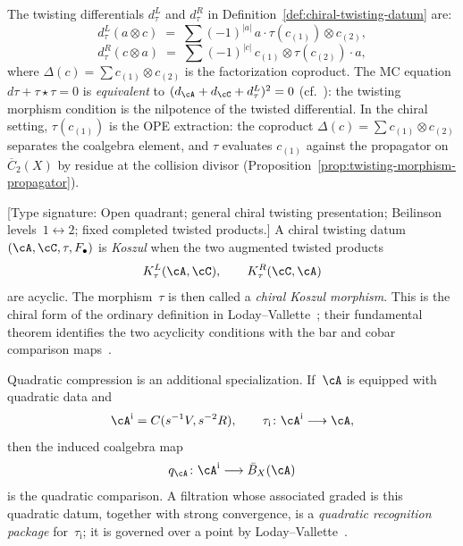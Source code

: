 \begin{remark}
\label{rem:explicit-twisted-differential}
The twisting differentials $d_\tau^L$ and $d_\tau^R$ in
Definition~\ref{def:chiral-twisting-datum} are:
\begin{equation}\label{eq:chiral-twisted-differential-L}
d_\tau^L(a \otimes c)
\;=\;
\sum (-1)^{|a|}\, a \cdot \tau(c_{(1)}) \otimes c_{(2)},
\end{equation}
\begin{equation}\label{eq:chiral-twisted-differential-R}
d_\tau^R(c \otimes a)
\;=\;
\sum (-1)^{|c|}\, c_{(1)} \otimes \tau(c_{(2)}) \cdot a,
\end{equation}
where $\Delta(c) = \sum c_{(1)} \otimes c_{(2)}$ is the factorization
coproduct. The MC equation $d\tau + \tau \star \tau = 0$ is
\emph{equivalent} to $(d_\cA + d_\cC + d_\tau^L)^2 = 0$
\textup{(}cf.\ \cite[Lemma~2.1.4]{LV12}\textup{)}: the twisting
morphism condition is the nilpotence of the twisted differential.
In the chiral setting, $\tau(c_{(1)})$ is the OPE extraction:
the coproduct $\Delta(c) = \sum c_{(1)} \otimes c_{(2)}$ separates
the coalgebra element, and $\tau$ evaluates $c_{(1)}$ against the
propagator on~$\overline{C}_2(X)$ by residue at the collision
divisor
\textup{(}Proposition~\textup{\ref{prop:twisting-morphism-propagator})}.
\end{remark}

\begin{definition}\label{def:chiral-koszul-morphism}
\textup{[Type signature: Open quadrant; general chiral twisting
presentation; Beilinson levels~$1\leftrightarrow2$; fixed completed
twisted products.]}
A chiral twisting datum $(\cA,\cC,\tau,F_\bullet)$ is
\emph{Koszul} when the two augmented twisted products
\[
 K_\tau^L(\cA,\cC),\qquad K_\tau^R(\cC,\cA)
\]
are acyclic.  The morphism~$\tau$ is then called a
\emph{chiral Koszul morphism}.  This is the chiral form of the
ordinary definition in Loday--Vallette~\cite[\S2.3]{LV12}; their
fundamental theorem identifies the two acyclicity conditions with the
bar and cobar comparison maps~\cite[Theorem~2.3.2]{LV12}.

Quadratic compression is an additional specialization.  If~$\cA$ is
equipped with quadratic data and
\[
 \cA^{\mathrm i}=C(s^{-1}V,s^{-2}R),\qquad
 \tau_{\mathrm i}\colon\cA^{\mathrm i}\longrightarrow\cA,
\]
then the induced coalgebra map
\[
 q_\cA\colon\cA^{\mathrm i}\longrightarrow\bar B_X(\cA)
\]
is the quadratic comparison.  A filtration whose associated graded is
this quadratic datum, together with strong convergence, is a
\emph{quadratic recognition package} for~$\tau_{\mathrm i}$; it is governed
over a point by Loday--Vallette~\cite[Theorem~3.4.6]{LV12}.
\end{definition}

